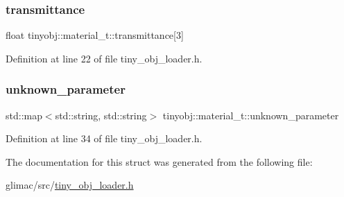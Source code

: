 \subsubsection{\texorpdfstring{transmittance}{transmittance}}
{\footnotesize\ttfamily float tinyobj\+::material\+\_\+t\+::transmittance\mbox{[}3\mbox{]}}



Definition at line 22 of file tiny\+\_\+obj\+\_\+loader.\+h.

\mbox{\label{structtinyobj_1_1material__t_a18b700227c94d410ed1aa550c7fa9226}} 
\subsubsection{\texorpdfstring{unknown\+\_\+parameter}{unknown\_parameter}}
{\footnotesize\ttfamily std\+::map$<$std\+::string, std\+::string$>$ tinyobj\+::material\+\_\+t\+::unknown\+\_\+parameter}



Definition at line 34 of file tiny\+\_\+obj\+\_\+loader.\+h.



The documentation for this struct was generated from the following file\+:\begin{DoxyCompactItemize}
\item 
glimac/src/\hyperlink{tiny__obj__loader_8h}{tiny\+\_\+obj\+\_\+loader.\+h}\end{DoxyCompactItemize}

